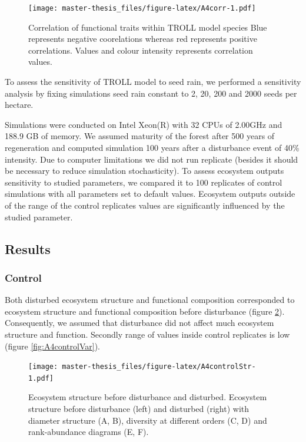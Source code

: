 \documentclass[12pt,]{article}
\theoremstyle{definition}
\theoremstyle{definition}
\theoremstyle{remark}
\begin{document}
\begin{figure}[htbp]
\centering
\texttt{[image: master-thesis\_files/figure-latex/A4corr-1.pdf]}
\caption{\label{fig:A4corr}Correlation of functional traits within TROLL
model species Blue represents negative coorelations whereas red
represents positive correlations. Values and colour intensity represents
correlation values.}
\end{figure}

To assess the sensitivity of TROLL model to seed rain, we performed a
sensitivity analysis by fixing simulations seed rain constant to 2, 20,
200 and 2000 seeds per hectare.

Simulations were conducted on Intel Xeon(R) with 32 CPUs of 2.00GHz and
188.9 GB of memory. We assumed maturity of the forest after 500 years of
regeneration \citep{Li} and computed simulation 100 years after a
disturbance event of 40\% intensity. Due to computer limitations we did
not run replicate (besides it should be necessary to reduce simulation
stochasticity). To assess ecosystem outputs sensitivity to studied
parameters, we compared it to 100 replicates of control simulations with
all parameters set to default values. Ecosystem outputs outside of the
range of the control replicates values are significantly influenced by
the studied parameter.

\subsection{Results}\label{results-2}

\subsubsection{Control}\label{control}

Both disturbed ecosystem structure and functional composition
corresponded to ecosystem structure and functional composition before
disturbance (figure \ref{fig:A4controlStr}). Consequently, we assumed
that disturbance did not affect much ecosystem structure and function.
Secondly range of values inside control replicates is low (figure
\ref{fig:A4controlVar}).

\begin{figure}[htbp]
\centering
\texttt{[image: master-thesis\_files/figure-latex/A4controlStr-1.pdf]}
\caption{\label{fig:A4controlStr}Ecosystem structure before disturbance and
disturbed. Ecosystem structure before disturbance (left) and disturbed
(right) with diameter structure (A, B), diversity at different orders
(C, D) and rank-abundance diagrams (E, F).}
\end{figure}
\end{document}
